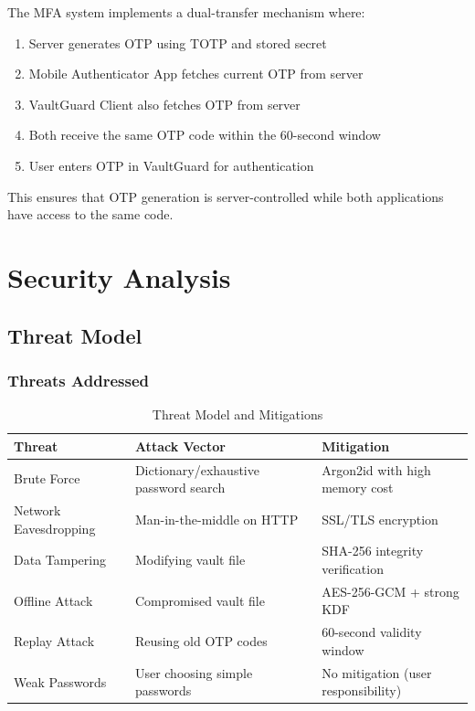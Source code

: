 \documentclass[12pt,a4paper]{report}
\begin{document}
The MFA system implements a dual-transfer mechanism where:

\begin{enumerate}
    \item Server generates OTP using TOTP and stored secret
    \item Mobile Authenticator App fetches current OTP from server
    \item VaultGuard Client also fetches OTP from server
    \item Both receive the same OTP code within the 60-second window
    \item User enters OTP in VaultGuard for authentication
\end{enumerate}

This ensures that OTP generation is server-controlled while both applications have access to the same code.

\chapter{Security Analysis}

\section{Threat Model}

\subsection{Threats Addressed}

\begin{table}[H]
\centering
\begin{tabular}{|p{3cm}|p{4cm}|p{4cm}|}
\hline
\textbf{Threat} & \textbf{Attack Vector} & \textbf{Mitigation} \\
\hline
Brute Force & Dictionary/exhaustive password search & Argon2id with high memory cost \\
Network Eavesdropping & Man-in-the-middle on HTTP & SSL/TLS encryption \\
Data Tampering & Modifying vault file & SHA-256 integrity verification \\
Offline Attack & Compromised vault file & AES-256-GCM + strong KDF \\
Replay Attack & Reusing old OTP codes & 60-second validity window \\
Weak Passwords & User choosing simple passwords & No mitigation (user responsibility) \\
\hline
\end{tabular}
\caption{Threat Model and Mitigations}
\end{table}
\end{document}
